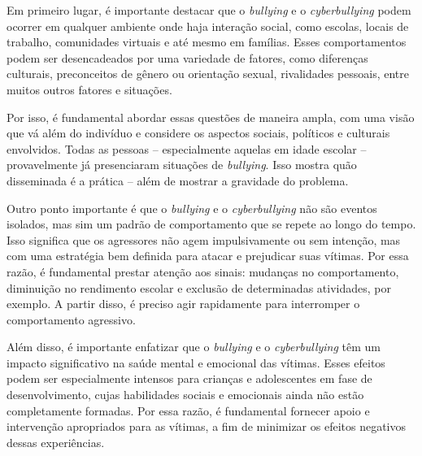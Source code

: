 Em primeiro lugar, é importante destacar que o {\em bullying} e o
{\em cyberbullying} podem ocorrer em qualquer ambiente onde haja
interação social, como escolas, locais de trabalho, comunidades virtuais
e até mesmo em famílias. Esses comportamentos podem ser desencadeados
por uma variedade de fatores, como diferenças culturais, preconceitos de
gênero ou orientação sexual, rivalidades pessoais, entre muitos outros
fatores e situações.

Por isso, é fundamental abordar essas questões de maneira ampla, com uma
visão que vá além do indivíduo e considere os aspectos sociais,
políticos e culturais envolvidos. Todas as pessoas -- especialmente
aquelas em idade escolar -- provavelmente já presenciaram situações de
{\em bullying}. Isso mostra quão disseminada é a prática -- além de
mostrar a gravidade do problema.



Outro ponto importante é que o {\em bullying} e o {\em cyberbullying}
não são eventos isolados, mas sim um padrão de comportamento que se
repete ao longo do tempo. Isso significa que os agressores não agem
impulsivamente ou sem intenção, mas com uma estratégia bem definida para
atacar e prejudicar suas vítimas. Por essa razão, é fundamental prestar
atenção aos sinais: mudanças no comportamento, diminuição no rendimento
escolar e exclusão de determinadas atividades, por exemplo. A partir
disso, é preciso agir rapidamente para interromper o comportamento
agressivo.

Além disso, é importante enfatizar que o {\em bullying} e o
{\em cyberbullying} têm um impacto significativo na saúde mental e
emocional das vítimas. Esses efeitos podem ser especialmente intensos
para crianças e adolescentes em fase de desenvolvimento, cujas
habilidades sociais e emocionais ainda não estão completamente formadas.
Por essa razão, é fundamental fornecer apoio e intervenção apropriados
para as vítimas, a fim de minimizar os efeitos negativos dessas
experiências.

\startmarginblock
{}
\stopmarginblock

